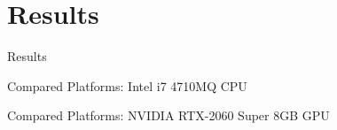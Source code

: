 \setlength{\parskip}{\baselineskip}
\section{Results}

\begin{frame}
	\huge Results
\end{frame}

\begin{frame}{Compared Platforms: Intel i7 4710MQ CPU}
\end{frame}

\begin{frame}{Compared Platforms: NVIDIA RTX-2060 Super 8GB GPU}
\end{frame}

